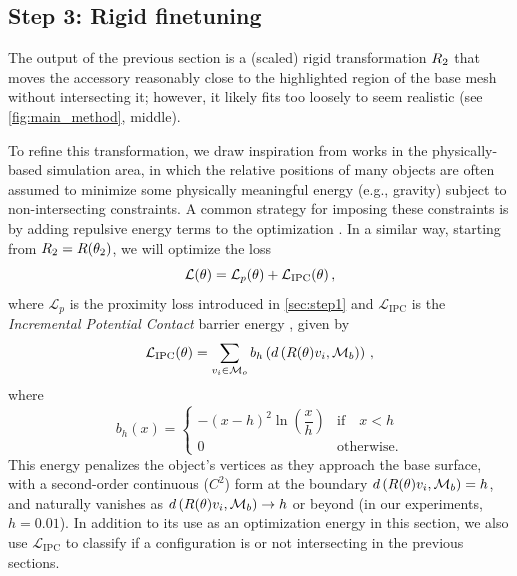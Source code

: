 




\subsection{Step 3: Rigid finetuning}
\label{sec:step3}
The output of the previous section is a (scaled) rigid transformation $R_2$ that moves the accessory reasonably close to the highlighted region of the base mesh without intersecting it; however, it likely fits too loosely to seem realistic (see \autoref{fig:main_method}, middle).

To refine this transformation, we draw inspiration from works in the physically-based simulation area, in which the relative positions of many objects are often assumed to minimize some physically meaningful energy (e.g., gravity) subject to non-intersecting constraints.
A common strategy for imposing these constraints is by adding repulsive energy terms to the optimization \cite{baraff1998large,li2020incremental,lan2024efficient}.
In a similar way, starting from $R_2 = R(\theta_2)$, we will optimize the loss
\begin{equation}\label{equ:total-loss}
\mathcal{L}(\theta) = \mathcal{L}_{p}(\theta) + \mathcal{L}_{\text{IPC}}(\theta)\,,
\end{equation}
where $\mathcal{L}_{p}$ is the proximity loss introduced in \autoref{sec:step1} and $\mathcal{L}_{\text{IPC}}$ is the \emph{Incremental Potential Contact} barrier energy \cite{li2020incremental}, given by
\begin{equation*}
\mathcal{L}_{\text{IPC}}(\theta) = \sum_{v_i \in \mathcal{M}_o} b_{h}\left(d\left(R(\theta)v_i,\mathcal{M}_b\right)\right)\,,
\label{contact_loss}
\end{equation*}
where
\begin{equation*}
    b_h(x) =
    \begin{cases}
      -(x-h)^{2}\ln\left( \dfrac{x}{h} \right) & \text{if}\quad x < h \\
      0       & \text{otherwise.}
    \end{cases}
\end{equation*}
This energy penalizes the object's vertices as they approach the base surface, with a second-order continuous (\( C^2 \)) form at the boundary \( d\left(R(\theta)v_i,\mathcal{M}_b\right) = h \), and naturally vanishes as \( d\left(R(\theta)v_i,\mathcal{M}_b\right) \to h \) or beyond (in our experiments, $h=0.01$). In addition to its use as an optimization energy in this section, we also use $\mathcal{L}_{\text{IPC}}$ to classify if a configuration is or not intersecting in the previous sections.

